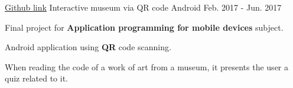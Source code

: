 \begin{cventries}
  \cventry
    {\href{https://github.com/matl1995/PDM/tree/master/Museo}{Github link}} %
    {Interactive museum via QR code} %
    {Android} %
    {Feb. 2017 - Jun. 2017} %
    {
      \begin{cvitems} %
        \item {Final project for \textbf{Application programming for mobile devices} subject.}
        \item {Android application using \textbf{QR} code scanning.}
        \item {When reading the code of a work of art from a museum, it presents the user a quiz related to it.}
      \end{cvitems}
    }

\end{cventries}
